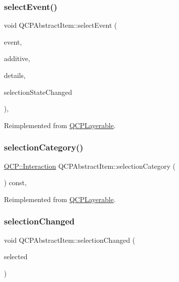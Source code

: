 \subsubsection{\texorpdfstring{selectEvent()}{selectEvent()}}
{\footnotesize\ttfamily void Q\+C\+P\+Abstract\+Item\+::select\+Event (\begin{DoxyParamCaption}\item[{Q\+Mouse\+Event $\ast$}]{event,  }\item[{bool}]{additive,  }\item[{const Q\+Variant \&}]{details,  }\item[{bool $\ast$}]{selection\+State\+Changed }\end{DoxyParamCaption})\hspace{0.3cm}{\ttfamily [protected]}, {\ttfamily [virtual]}}



Reimplemented from \mbox{\hyperlink{class_q_c_p_layerable_a7498c2d0d081cf7cad0fb3bb93aa0e91}{Q\+C\+P\+Layerable}}.

\mbox{\label{class_q_c_p_abstract_item_aceb5f99c361cf023c7cbe7339ea29571}} 
\subsubsection{\texorpdfstring{selectionCategory()}{selectionCategory()}}
{\footnotesize\ttfamily \mbox{\hyperlink{namespace_q_c_p_a2ad6bb6281c7c2d593d4277b44c2b037}{Q\+C\+P\+::\+Interaction}} Q\+C\+P\+Abstract\+Item\+::selection\+Category (\begin{DoxyParamCaption}{ }\end{DoxyParamCaption}) const\hspace{0.3cm}{\ttfamily [protected]}, {\ttfamily [virtual]}}



Reimplemented from \mbox{\hyperlink{class_q_c_p_layerable_a908c9edda761886f33893be326dab77d}{Q\+C\+P\+Layerable}}.

\mbox{\label{class_q_c_p_abstract_item_aa5cffb034fc65dbb91c77e02c1c14251}} 
\subsubsection{\texorpdfstring{selectionChanged}{selectionChanged}}
{\footnotesize\ttfamily void Q\+C\+P\+Abstract\+Item\+::selection\+Changed (\begin{DoxyParamCaption}\item[{bool}]{selected }\end{DoxyParamCaption})\hspace{0.3cm}{\ttfamily [signal]}}


